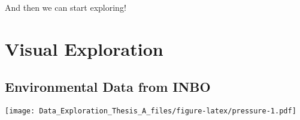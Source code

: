 \documentclass[]{article}
\newenvironment{Shaded}{\begin{snugshade}}{\end{snugshade}}
\newcommand{\KeywordTok}[1]{\textcolor[rgb]{0.13,0.29,0.53}{\textbf{#1}}}
\newcommand{\StringTok}[1]{\textcolor[rgb]{0.31,0.60,0.02}{#1}}
\newcommand{\OperatorTok}[1]{\textcolor[rgb]{0.81,0.36,0.00}{\textbf{#1}}}
\newcommand{\NormalTok}[1]{#1}
\begin{document}
\begin{Shaded}
\end{Shaded}

And then we can start exploring!

\section{Visual Exploration}\label{visual-exploration}

\subsection{Environmental Data from
INBO}\label{environmental-data-from-inbo}

\texttt{[image: Data\_Exploration\_Thesis\_A\_files/figure-latex/pressure-1.pdf]}
\end{document}
